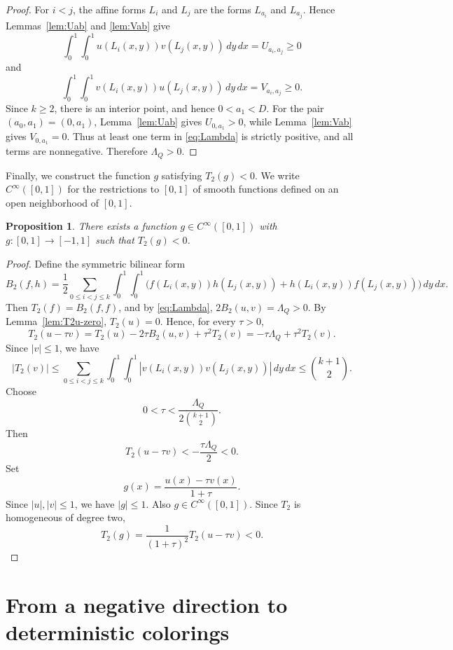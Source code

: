 \documentclass[twoside,12pt]{article}
\newcommand{\1}{\mathbf 1}
\newtheorem{proposition}{Proposition}[section]
\begin{document}
\begin{proof}
For \(i<j\), the affine forms \(L_i\) and \(L_j\) are the forms \(L_{a_i}\)
and \(L_{a_j}\).  Hence Lemmas~\ref{lem:Uab} and \ref{lem:Vab} give
\[
\int_0^1\!\int_0^1 u(L_i(x,y))v(L_j(x,y))\,dy\,dx
=U_{a_i,a_j}\ge0
\]
and
\[
\int_0^1\!\int_0^1 v(L_i(x,y))u(L_j(x,y))\,dy\,dx
=V_{a_i,a_j}\ge0.
\]
Since \(k\ge2\), there is an interior point, and hence \(0<a_1<D\).  For the
pair \((a_0,a_1)=(0,a_1)\), Lemma~\ref{lem:Uab} gives \(U_{0,a_1}>0\), while
Lemma~\ref{lem:Vab} gives \(V_{0,a_1}=0\).  Thus at least one term in
\eqref{eq:Lambda} is strictly positive, and all terms are nonnegative.
Therefore \(\Lambda_Q>0\).
\end{proof}

Finally, we construct the function $g$ satisfying $T_2(g) < 0$.
We write \(C^\infty([0,1])\) for the restrictions to \([0,1]\) of smooth
functions defined on an open neighborhood of \([0,1]\).

\begin{proposition}\label{prop:negative-direction}
There exists a function \(g\in C^\infty([0,1])\) with
\(g:[0,1]\to[-1,1]\) such that \(T_2(g)<0\).
\end{proposition}

\begin{proof}
Define the symmetric bilinear form
\[
B_2(f,h)
=
\frac12
\sum_{0\le i<j\le k}
\int_0^1\!\int_0^1
\bigl(
f(L_i(x,y))h(L_j(x,y))
+
h(L_i(x,y))f(L_j(x,y))
\bigr)
\,dy\,dx.
\]
Then \(T_2(f)=B_2(f,f)\), and by \eqref{eq:Lambda},
\(2B_2(u,v)=\Lambda_Q>0\).  By Lemma~\ref{lem:T2u-zero}, \(T_2(u)=0\).  Hence,
for every \(\tau>0\),
\[
T_2(u-\tau v)
=
T_2(u)-2\tau B_2(u,v)+\tau^2T_2(v)
=
-\tau\Lambda_Q+\tau^2T_2(v).
\]
Since \(|v|\le1\), we have
\[
|T_2(v)|
\le
\sum_{0\le i<j\le k}
\int_0^1\!\int_0^1
|v(L_i(x,y))v(L_j(x,y))|\,dy\,dx
\le
\binom{k+1}{2}.
\]
Choose
\[
0<\tau<\frac{\Lambda_Q}{2\binom{k+1}{2}}.
\]
Then
\[
T_2(u-\tau v)<-\frac{\tau\Lambda_Q}{2}<0.
\]
Set
\[
g(x)=\frac{u(x)-\tau v(x)}{1+\tau}.
\]
Since \(|u|,|v|\le1\), we have \(|g|\le1\).  Also
\(g\in C^\infty([0,1])\).  Since \(T_2\) is homogeneous of degree two,
\[
T_2(g)=\frac{1}{(1+\tau)^2}T_2(u-\tau v)<0.
\]
\end{proof}

\section{From a negative direction to deterministic colorings}
\label{sec:deterministic-colorings}
\end{document}
